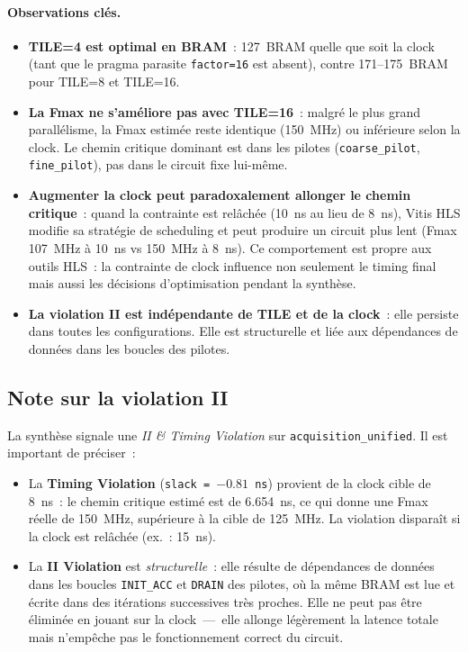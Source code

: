 \documentclass[11pt,a4paper]{article}
\begin{document}
\paragraph{Observations clés.}

\begin{itemize}
  \item \textbf{TILE=4 est optimal en BRAM}~: 127~BRAM quelle que soit la clock (tant que le pragma parasite \texttt{factor=16} est absent), contre 171--175~BRAM pour TILE=8 et TILE=16.
  \item \textbf{La Fmax ne s'améliore pas avec TILE=16}~: malgré le plus grand parallélisme, la Fmax estimée reste identique (150~MHz) ou inférieure selon la clock. Le chemin critique dominant est dans les pilotes (\texttt{coarse\_pilot}, \texttt{fine\_pilot}), pas dans le circuit fixe lui-même.
  \item \textbf{Augmenter la clock peut paradoxalement allonger le chemin critique}~: quand la contrainte est relâchée (10~ns au lieu de 8~ns), Vitis HLS modifie sa stratégie de scheduling et peut produire un circuit plus lent (Fmax 107~MHz à 10~ns vs 150~MHz à 8~ns). Ce comportement est propre aux outils HLS~: la contrainte de clock influence non seulement le timing final mais aussi les décisions d'optimisation pendant la synthèse.
  \item \textbf{La violation II est indépendante de TILE et de la clock}~: elle persiste dans toutes les configurations. Elle est structurelle et liée aux dépendances de données dans les boucles des pilotes.
\end{itemize}

\subsection{Note sur la violation II}

La synthèse signale une \textit{II \& Timing Violation} sur \texttt{acquisition\_unified}. Il est important de préciser~:

\begin{itemize}
  \item La \textbf{Timing Violation} (\texttt{slack = $-0.81$~ns}) provient de la clock cible de 8~ns~: le chemin critique estimé est de 6.654~ns, ce qui donne une Fmax réelle de 150~MHz, supérieure à la cible de 125~MHz. La violation disparaît si la clock est relâchée (ex.~: 15~ns).
  \item La \textbf{II Violation} est \textit{structurelle}~: elle résulte de dépendances de données dans les boucles \texttt{INIT\_ACC} et \texttt{DRAIN} des pilotes, où la même BRAM est lue et écrite dans des itérations successives très proches. Elle ne peut pas être éliminée en jouant sur la clock~---~elle allonge légèrement la latence totale mais n'empêche pas le fonctionnement correct du circuit.
\end{itemize}
\end{document}
